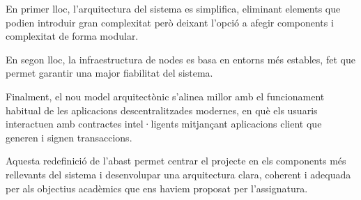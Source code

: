 \documentclass[12pt,a4paper]{article}
\begin{document}
En primer lloc, l'arquitectura del sistema es simplifica, eliminant elements que podien introduir gran complexitat però deixant l'opció a afegir components i complexitat de forma modular.

En segon lloc, la infraestructura de nodes es basa en entorns més estables, fet que permet garantir una major fiabilitat del sistema.

Finalment, el nou model arquitectònic s'alinea millor amb el funcionament habitual de les aplicacions descentralitzades modernes, en què els usuaris interactuen amb contractes intel·ligents mitjançant aplicacions client que generen i signen transaccions.

Aquesta redefinició de l'abast permet centrar el projecte en els components més rellevants del sistema i desenvolupar una arquitectura clara, coherent i adequada per als objectius acadèmics que ens haviem proposat per l'assignatura.
\end{document}
